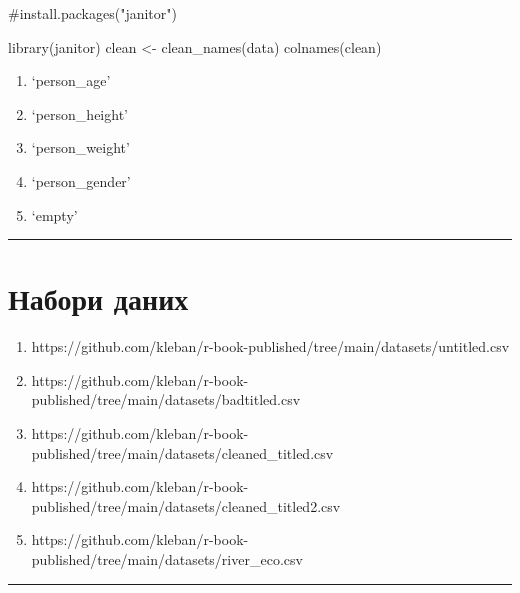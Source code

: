 \documentclass[
  letterpaper,
  DIV=11,
  numbers=noendperiod]{scrreprt}
\newenvironment{Shaded}{\begin{snugshade}}{\end{snugshade}}
\newcommand{\CommentTok}[1]{\textcolor[rgb]{0.37,0.37,0.37}{#1}}
\newcommand{\FunctionTok}[1]{\textcolor[rgb]{0.28,0.35,0.67}{#1}}
\newcommand{\NormalTok}[1]{\textcolor[rgb]{0.00,0.23,0.31}{#1}}
\newcommand{\OtherTok}[1]{\textcolor[rgb]{0.00,0.23,0.31}{#1}}
\providecommand{\tightlist}{%
  \setlength{\itemsep}{0pt}\setlength{\parskip}{0pt}}\usepackage{longtable,booktabs,array}
\begin{document}
\begin{Shaded}
\begin{Highlighting}[]
\CommentTok{\#install.packages("janitor")}
\end{Highlighting}
\end{Shaded}

\begin{Shaded}
\begin{Highlighting}[]
\FunctionTok{library}\NormalTok{(janitor)}
\NormalTok{clean }\OtherTok{\textless{}{-}} \FunctionTok{clean\_names}\NormalTok{(data)}
\FunctionTok{colnames}\NormalTok{(clean)}
\end{Highlighting}
\end{Shaded}

\begin{enumerate}
\def\labelenumi{\arabic{enumi}.}
\tightlist
\item
  `person\_age'
\item
  `person\_height'
\item
  `person\_weight'
\item
  `person\_gender'
\item
  `empty'
\end{enumerate}

\begin{center}\rule{0.5\linewidth}{0.5pt}\end{center}

\section{Набори
даних}\label{ux43dux430ux431ux43eux440ux438-ux434ux430ux43dux438ux445-8}

\begin{enumerate}
\def\labelenumi{\arabic{enumi}.}
\tightlist
\item
  https://github.com/kleban/r-book-published/tree/main/datasets/untitled.csv
\item
  https://github.com/kleban/r-book-published/tree/main/datasets/badtitled.csv
\item
  https://github.com/kleban/r-book-published/tree/main/datasets/cleaned\_titled.csv
\item
  https://github.com/kleban/r-book-published/tree/main/datasets/cleaned\_titled2.csv
\item
  https://github.com/kleban/r-book-published/tree/main/datasets/river\_eco.csv
\end{enumerate}

\begin{center}\rule{0.5\linewidth}{0.5pt}\end{center}
\end{document}
